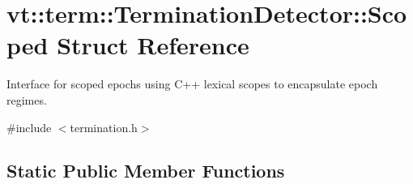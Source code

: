 \hypertarget{structvt_1_1term_1_1_termination_detector_1_1_scoped}{}\section{vt\+:\+:term\+:\+:Termination\+Detector\+:\+:Scoped Struct Reference}
\label{structvt_1_1term_1_1_termination_detector_1_1_scoped}


Interface for scoped epochs using C++ lexical scopes to encapsulate epoch regimes.  




{\ttfamily \#include $<$termination.\+h$>$}

\subsection*{Static Public Member Functions}
